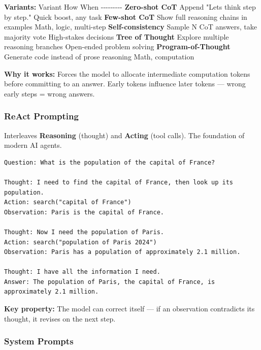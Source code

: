\documentclass[11pt]{article}
\begin{document}
\textbf{Variants:}
\textbar{} Variant \textbar{} How \textbar{} When \textbar{}
\textbar-\/-\/-\textbar-\/-\/-\textbar-\/-\/-\textbar{}
\textbar{} \textbf{Zero-shot CoT} \textbar{} Append "Let\textquotesingle s think step by step." \textbar{} Quick boost, any task \textbar{}
\textbar{} \textbf{Few-shot CoT} \textbar{} Show full reasoning chains in examples \textbar{} Math, logic, multi-step \textbar{}
\textbar{} \textbf{Self-consistency} \textbar{} Sample N CoT answers, take majority vote \textbar{} High-stakes decisions \textbar{}
\textbar{} \textbf{Tree of Thought} \textbar{} Explore multiple reasoning branches \textbar{} Open-ended problem solving \textbar{}
\textbar{} \textbf{Program-of-Thought} \textbar{} Generate code instead of prose reasoning \textbar{} Math, computation \textbar{}

\textbf{Why it works:} Forces the model to allocate intermediate computation tokens before committing to an answer. Early tokens influence later tokens --- wrong early steps = wrong answers.

\subsubsection{ReAct Prompting}\label{react-prompting}

Interleaves \textbf{Reasoning} (thought) and \textbf{Acting} (tool calls). The foundation of modern AI agents.

\setcodelang{}

\begin{verbatim}
Question: What is the population of the capital of France?

Thought: I need to find the capital of France, then look up its population.
Action: search("capital of France")
Observation: Paris is the capital of France.

Thought: Now I need the population of Paris.
Action: search("population of Paris 2024")
Observation: Paris has a population of approximately 2.1 million.

Thought: I have all the information I need.
Answer: The population of Paris, the capital of France, is approximately 2.1 million.
\end{verbatim}

\textbf{Key property:} The model can correct itself --- if an observation contradicts its thought, it revises on the next step.

\subsubsection{System Prompts}\label{system-prompts}
\end{document}

